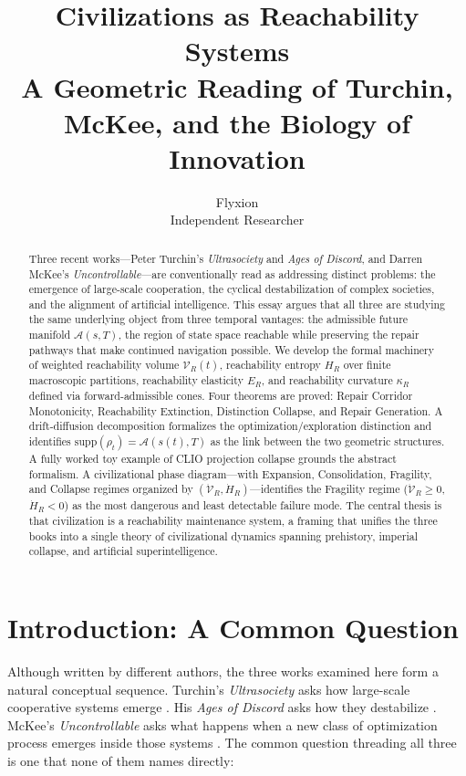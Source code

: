 \documentclass[12pt, a4paper]{article}
\title{\textbf{Civilizations as Reachability Systems}\\[0.4em]
\large A Geometric Reading of Turchin, McKee, and the Biology of Innovation}
\author{Flyxion\\Independent Researcher}
\date{}
\theoremstyle{plain}
\theoremstyle{definition}
\theoremstyle{remark}
\begin{document}
\maketitle

\begin{abstract}
Three recent works---Peter Turchin's \textit{Ultrasociety} and \textit{Ages of Discord}, and Darren McKee's \textit{Uncontrollable}---are conventionally read as addressing distinct problems: the emergence of large-scale cooperation, the cyclical destabilization of complex societies, and the alignment of artificial intelligence. This essay argues that all three are studying the same underlying object from three temporal vantages: the admissible future manifold $\mathcal{A}(s,T)$, the region of state space reachable while preserving the repair pathways that make continued navigation possible. We develop the formal machinery of weighted reachability volume $\mathcal{V}_R(t)$, reachability entropy $H_R$ over finite macroscopic partitions, reachability elasticity $E_R$, and reachability curvature $\kappa_R$ defined via forward-admissible cones. Four theorems are proved: Repair Corridor Monotonicity, Reachability Extinction, Distinction Collapse, and Repair Generation. A drift-diffusion decomposition formalizes the optimization/exploration distinction and identifies $\mathrm{supp}(\rho_t) = \mathcal{A}(s(t),T)$ as the link between the two geometric structures. A fully worked toy example of CLIO projection collapse grounds the abstract formalism. A civilizational phase diagram---with Expansion, Consolidation, Fragility, and Collapse regimes organized by $(\dot{\mathcal{V}}_R, \dot{H}_R)$---identifies the Fragility regime ($\dot{\mathcal{V}}_R \geq 0$, $\dot{H}_R < 0$) as the most dangerous and least detectable failure mode. The central thesis is that civilization is a reachability maintenance system, a framing that unifies the three books into a single theory of civilizational dynamics spanning prehistory, imperial collapse, and artificial superintelligence.
\end{abstract}

\newpage

\section{Introduction: A Common Question}

Although written by different authors, the three works examined here form a natural conceptual sequence. Turchin's \textit{Ultrasociety} asks how large-scale cooperative systems emerge \cite{turchin2016}. His \textit{Ages of Discord} asks how they destabilize \cite{turchin2023}. McKee's \textit{Uncontrollable} asks what happens when a new class of optimization process emerges inside those systems \cite{mckee2024}. The common question threading all three is one that none of them names directly:
\end{document}
